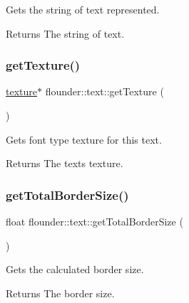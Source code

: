 Gets the string of text represented. 

\begin{DoxyReturn}{Returns}
The string of text. 
\end{DoxyReturn}
\mbox{\label{classflounder_1_1text_a9bb772e20f65be7cab18a52ba995af76}} 
\subsubsection{\texorpdfstring{get\+Texture()}{getTexture()}}
{\footnotesize\ttfamily \hyperlink{classflounder_1_1texture}{texture}$\ast$ flounder\+::text\+::get\+Texture (\begin{DoxyParamCaption}{ }\end{DoxyParamCaption})\hspace{0.3cm}{\ttfamily [inline]}}



Gets font type texture for this text. 

\begin{DoxyReturn}{Returns}
The texts texture. 
\end{DoxyReturn}
\mbox{\label{classflounder_1_1text_a374447968e82dd7e58e1cfb84c4adfb6}} 
\subsubsection{\texorpdfstring{get\+Total\+Border\+Size()}{getTotalBorderSize()}}
{\footnotesize\ttfamily float flounder\+::text\+::get\+Total\+Border\+Size (\begin{DoxyParamCaption}{ }\end{DoxyParamCaption})}



Gets the calculated border size. 

\begin{DoxyReturn}{Returns}
The border size. 
\end{DoxyReturn}
\mbox{\label{classflounder_1_1text_a6b1a82e19fcfc8b4608ea02d0a8603d9}} 
